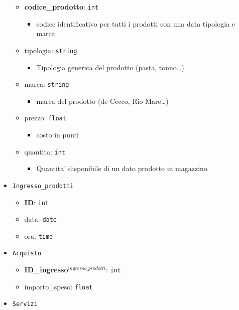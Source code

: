 \documentclass[]{article}
\providecommand{\tightlist}{%
  \setlength{\itemsep}{0pt}\setlength{\parskip}{0pt}}
\begin{document}
\begin{itemize}
  \begin{itemize}
  \tightlist
  \item
    \textbf{codice\_prodotto}: \texttt{int}

    \begin{itemize}
    \tightlist
    \item
      codice identificativo per tutti i prodotti con una data tipologia
      e marca
    \end{itemize}
  \item
    tipologia: \texttt{string}

    \begin{itemize}
    \tightlist
    \item
      Tipologia generica del prodotto (pasta, tonno\ldots{})
    \end{itemize}
  \item
    marca: \texttt{string}

    \begin{itemize}
    \tightlist
    \item
      marca del prodotto (de Cecco, Rio Mare\ldots{})
    \end{itemize}
  \item
    prezzo: \texttt{float}

    \begin{itemize}
    \tightlist
    \item
      costo in punti
    \end{itemize}
  \item
    quantita: \texttt{int}

    \begin{itemize}
    \tightlist
    \item
      Quantita' disponibile di un dato prodotto in magazzino
    \end{itemize}
  \end{itemize}
\item
  \texttt{Ingresso\_prodotti}

  \begin{itemize}
  \tightlist
  \item
    \textbf{ID}: \texttt{int}
  \item
    data: \texttt{date}
  \item
    ora: \texttt{time}
  \end{itemize}
\item
  \texttt{Acquisto}

  \begin{itemize}
  \tightlist
  \item
    \textbf{ID\_ingresso}\(^{ingresso\_prodotti}\): \texttt{int}
  \item
    importo\_speso: \texttt{float}
  \end{itemize}
\item
  \texttt{Servizi}


\end{itemize}
\end{document}
